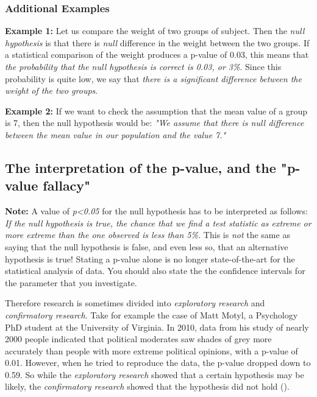 \subsubsection{Additional Examples}

\textbf{Example 1: } Let us compare the weight of two groups of subject. Then the \emph{null hypothesis} is that there is \emph{null} difference in the weight between the two groups. If a statistical comparison of the weight produces a p-value of 0.03, this means that \emph{the probability that the null hypothesis is correct is 0.03, or 3\%}. Since this probability is quite low, we say that \emph{there is a significant difference between the weight of the two groups}.

\textbf{Example 2: } If we want to check the assumption that the mean value of a group is 7, then the null hypothesis would be: \emph{"We assume that there is null difference between the mean value in our population and the value 7."}

\subsection{The interpretation of the p-value, and the "p-value fallacy"}

\textbf{Note:} A value of \emph{p<0.05} for the null hypothesis has to be interpreted as follows: \emph{If the null hypothesis is true, the chance that we find a test statistic as extreme or more extreme than the one observed is less than 5\%.} This is \emph{not} the same as saying that the null hypothesis is false, and even less so, that an alternative hypothesis is true! Stating a p-value alone is no longer state-of-the-art for the statistical analysis of data. You should also state the the confidence intervals for the parameter that you investigate.

Therefore research is sometimes divided into \emph{exploratory research} and \emph{confirmatory research}. Take for example the case of Matt Motyl, a Psychology PhD student at the University of Virginia. In 2010, data from his study of nearly 2000 people indicated that political moderates saw shades of grey more accurately than people with more extreme political opinions, with a p-value of 0.01. However, when he tried to reproduce the data, the p-value dropped down to 0.59. So while the \emph{exploratory research} showed that a certain hypothesis may be likely, the \emph{confirmatory research} showed that the hypothesis did not hold (\cite{Nuzzo2014}).


